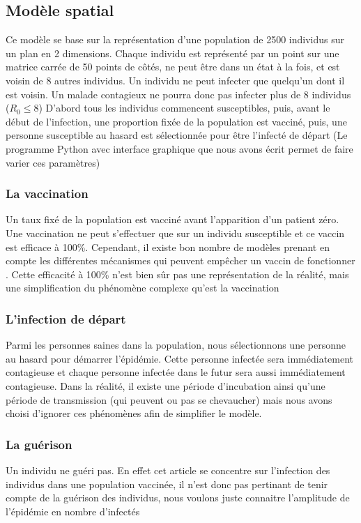 \documentclass[journal, a4paper]{IEEEtran}
\begin{document}
	\subsection{Modèle spatial}
	\label{sec:modele_spatial}
	Ce modèle se base sur la représentation d'une population de 2500 individus sur un plan en 2 dimensions. Chaque individu est représenté par un point sur une matrice carrée de 50 points de côtés, ne peut être dans un état à la fois, et est voisin de 8 autres individus. Un individu ne peut infecter que quelqu'un dont il est voisin. Un malade contagieux ne pourra donc pas infecter plus de 8 individus ($R_0 \leq 8$)
	D'abord tous les individus commencent susceptibles, puis, avant le début de l'infection, une proportion fixée de la population est vacciné, puis, une personne susceptible au hasard est sélectionnée pour être l'infecté de départ (Le programme Python avec interface graphique que nous avons écrit permet de faire varier ces paramètres)
	\subsubsection{La vaccination}
	Un taux fixé de la population est vacciné avant l'apparition d'un patient zéro. Une vaccination ne peut s'effectuer que sur un individu susceptible et ce vaccin est efficace à 100\%. Cependant, il existe bon nombre de modèles prenant en compte les différentes mécanismes qui peuvent empêcher un vaccin de fonctionner \cite{Crowcroft_Klein_2018}. Cette efficacité à 100\% n'est bien sûr pas une représentation de la réalité, mais une simplification du phénomène complexe qu'est la vaccination
	\subsubsection{L'infection de départ}
	Parmi les personnes saines dans la population, nous sélectionnons une personne au hasard pour démarrer l'épidémie. Cette personne infectée sera immédiatement contagieuse et chaque personne infectée dans le futur sera aussi immédiatement contagieuse. Dans la réalité, il existe une période d'incubation ainsi qu'une période de transmission (qui peuvent ou pas se chevaucher) mais nous avons choisi d'ignorer ces phénomènes afin de simplifier le modèle.
	\subsubsection{La guérison}
	Un individu ne guéri pas. En effet cet article se concentre sur l'infection des individus dans une population vaccinée, il n'est donc pas pertinant de tenir compte de la guérison des individus, nous voulons juste connaitre l'amplitude de l'épidémie en nombre d'infectés
\end{document}
